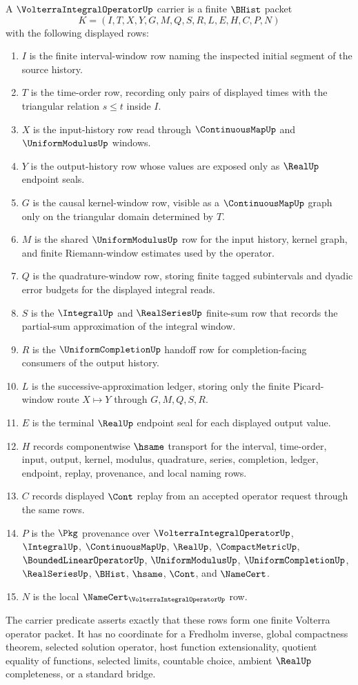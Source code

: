\begin{definition}
\label{def:volterra-integral-operator-carrier}
A $\VolterraIntegralOperatorUp$ carrier is a finite $\BHist$ packet
$$
K=(I,T,X,Y,G,M,Q,S,R,L,E,H,C,P,N)
$$
with the following displayed rows:
\begin{enumerate}
\item $I$ is the finite interval-window row naming the inspected initial segment of the source history.
\item $T$ is the time-order row, recording only pairs of displayed times with the triangular relation $s\leq t$ inside $I$.
\item $X$ is the input-history row read through $\ContinuousMapUp$ and $\UniformModulusUp$ windows.
\item $Y$ is the output-history row whose values are exposed only as $\RealUp$ endpoint seals.
\item $G$ is the causal kernel-window row, visible as a $\ContinuousMapUp$ graph only on the triangular domain determined by $T$.
\item $M$ is the shared $\UniformModulusUp$ row for the input history, kernel graph, and finite Riemann-window estimates used by the operator.
\item $Q$ is the quadrature-window row, storing finite tagged subintervals and dyadic error budgets for the displayed integral reads.
\item $S$ is the $\IntegralUp$ and $\RealSeriesUp$ finite-sum row that records the partial-sum approximation of the integral window.
\item $R$ is the $\UniformCompletionUp$ handoff row for completion-facing consumers of the output history.
\item $L$ is the successive-approximation ledger, storing only the finite Picard-window route $X\mapsto Y$ through $G,M,Q,S,R$.
\item $E$ is the terminal $\RealUp$ endpoint seal for each displayed output value.
\item $H$ records componentwise $\hsame$ transport for the interval, time-order, input, output, kernel, modulus, quadrature, series, completion, ledger, endpoint, replay, provenance, and local naming rows.
\item $C$ records displayed $\Cont$ replay from an accepted operator request through the same rows.
\item $P$ is the $\Pkg$ provenance over $\VolterraIntegralOperatorUp$, $\IntegralUp$, $\ContinuousMapUp$, $\RealUp$, $\CompactMetricUp$, $\BoundedLinearOperatorUp$, $\UniformModulusUp$, $\UniformCompletionUp$, $\RealSeriesUp$, $\BHist$, $\hsame$, $\Cont$, and $\NameCert$.
\item $N$ is the local $\NameCert_{\VolterraIntegralOperatorUp}$ row.
\end{enumerate}
The carrier predicate asserts exactly that these rows form one finite Volterra operator packet. It has no coordinate for a Fredholm inverse, global compactness theorem, selected solution operator, host function extensionality, quotient equality of functions, selected limits, countable choice, ambient $\RealUp$ completeness, or a standard bridge.
\end{definition}

